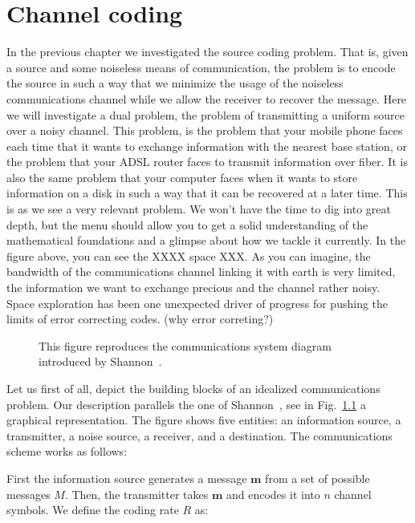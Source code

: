 \chapter{Channel coding}
In the previous chapter we investigated the source coding problem. That is, given a source and some noiseless means of communication, the problem is to encode the source in such a way that we minimize the usage of the noiseless communications channel while we allow the receiver to recover the message. Here we will investigate a dual problem, the problem of transmitting a uniform source over a noisy channel. This problem, is the problem that your mobile phone faces each time that it wants to exchange information with the nearest base station, or the problem that your ADSL router faces to transmit information over fiber. It is also the same problem that your computer faces when it wants to store information on a disk in such a way that it can be recovered at a later time. This is as we see a very relevant problem. We won't have the time to dig into great depth, but the menu should allow you to get a solid understanding of the mathematical foundations and a glimpse about how we tackle it currently. In the figure above, you can see the XXXX space XXX. As you can imagine, the bandwidth of the communications channel linking it with earth is very limited, the information we want to exchange precious and the channel rather noisy. Space exploration has been one unexpected driver of progress for pushing the limits of error correcting codes. (why error correting?)
\begin{figure}[h!]
\begin{center}
\def\svgwidth{\columnwidth} 

\end{center}
\caption[Communications system diagram.]{This figure reproduces the communications system diagram introduced by Shannon~\cite{Shannon_48}.}
\label{fig:shannoncom}
\end{figure}
Let us first of all, depict the building blocks of an idealized communications problem. Our description parallels the one of Shannon~\cite{Shannon_48}, see in Fig.~\ref{fig:shannoncom} a graphical representation. The figure shows five entities: an information source, a transmitter, a noise source, a receiver, and a destination. The communications scheme works as follows: 

First the information source generates a message $\mathbf m$ from a set of possible messages $M$. Then, the transmitter takes $\mathbf m$ and encodes it into $n$ channel symbols. We define the coding rate $R$ as:

